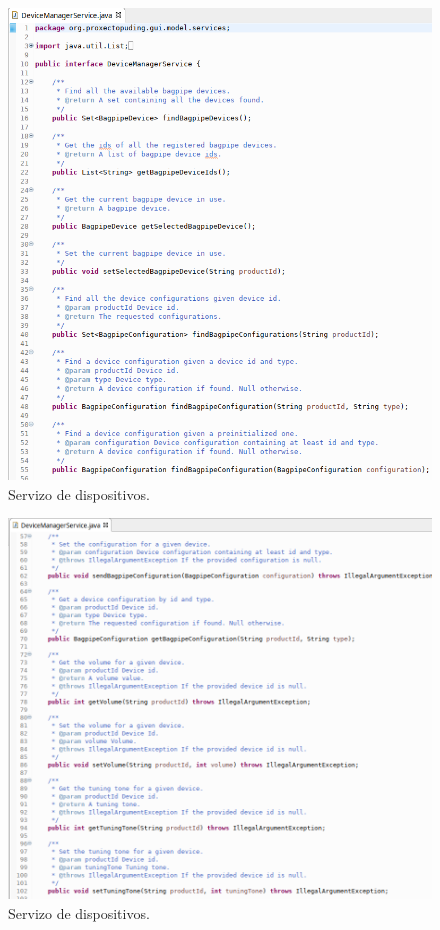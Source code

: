    \begin{figure}[htbp]
    \centering
    \includegraphics[scale=0.6, keepaspectratio=true]{./imagenes/servizo-dispositivos-1.png}
    \caption{Servizo de dispositivos.}
    \label{figura:ServizoDispositivos1}
   \end{figure}
   
   \begin{figure}[htbp]
    \centering
    \includegraphics[scale=0.6, keepaspectratio=true]{./imagenes/servizo-dispositivos-2.png}
    \caption{Servizo de dispositivos.}
    \label{figura:ServizoDispositivos2}
   \end{figure}
   
